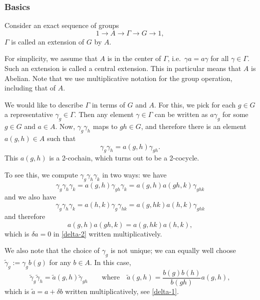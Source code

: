 \documentclass[12pt]{article}
\numberwithin{equation}{section}
\numberwithin{figure}{section}
\theoremstyle{remark}
\begin{document}
\subsubsection{Basics}
Consider an exact sequence of groups \begin{equation}
1\to A\to \Gamma \to G\to 1,
\label{central-ext}
\end{equation} 
$\Gamma$ is called an extension of $G$ by $A$.

For simplicity, we assume that $A$ is in the center of $\Gamma$,
i.e.~$\gamma a = a\gamma$ for all $\gamma \in \Gamma$.
Such an extension is called a central extension.
This in particular means that $A$ is Abelian.
Note that we use multiplicative notation for the group operation,
including that of $A$.

We would like to describe $\Gamma$ in terms of $G$ and $A$.
For this, we pick for each $g\in G$ a representative $\gamma_g\in \Gamma$.
Then any element $\gamma\in \Gamma$ can be written 
as $a \gamma_g $ for some $g\in G$ and $a\in A$.
Now, $\gamma_g \gamma_h$ maps to $gh\in G$,
and therefore there is an element $a(g,h)\in A$
such that \begin{equation}
\gamma_g \gamma_h = a(g,h) \gamma_{gh}.
\end{equation}
This $a(g,h)$ is a 2-cochain, which turns out to be a 2-cocycle.

To see this, we compute $\gamma_g \gamma_h \gamma_k$ in two ways:
we have
\begin{equation}
\gamma_g \gamma_h \gamma_k = a(g,h) \gamma_{gh} \gamma_k = a(g,h) a(gh,k) \gamma_{ghk}
\end{equation} and we also have
\begin{equation}
\gamma_g\gamma_h \gamma_k = a(h,k) \gamma_{g} \gamma_{hk} = a(g,hk) a(h,k) \gamma_{ghk}
\end{equation} and therefore \begin{equation}
a(g,h) a(gh,k) = a(g,hk) a(h,k),
\end{equation}
which is $\delta a=0$ in \eqref{delta-2} written multiplicatively.

We also note that the choice of $\gamma_g$ is not unique;
we can equally well choose $\tilde\gamma_g:=\gamma_g b(g)$ for any $b\in A$.
In this case, \begin{equation}
\tilde \gamma_g \tilde \gamma_h = \tilde a(g,h) \tilde\gamma_{gh} 
\qquad\text{where}\quad \tilde a(g,h)=\frac{b(g) b(h)}{b(gh)} a(g,h),
\end{equation}
which is $\tilde a=a + \delta b$ written multiplicatively, see \eqref{delta-1}.
\end{document}
